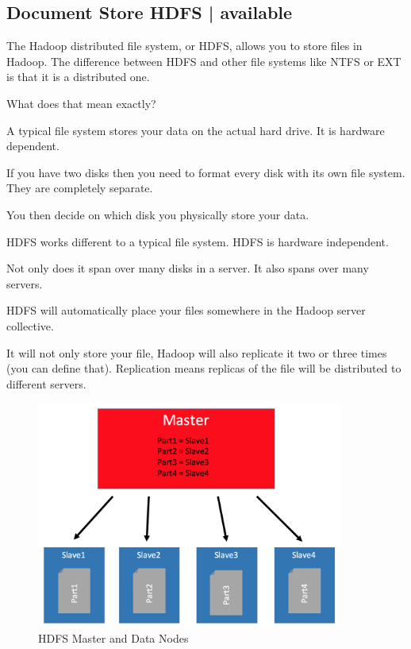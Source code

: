 \documentclass[12pt, numbers=noenddot]{scrreprt} %
\begin{document}
\subsection{Document Store HDFS | available}

The Hadoop distributed file system, or HDFS, allows you to store files in Hadoop. The difference between HDFS and other file systems like NTFS or EXT is that it is a distributed one.

What does that mean exactly?

A typical file system stores your data on the actual hard drive. It is hardware dependent.

If you have two disks then you need to format every disk with its own file system. They are completely separate.

You then decide on which disk you physically store your data.

HDFS works different to a typical file system. HDFS is hardware independent.

Not only does it span over many disks in a server. It also spans over many servers.

HDFS will automatically place your files somewhere in the Hadoop server collective.

It will not only store your file, Hadoop will also replicate it two or three times (you can define that). Replication means replicas of the file will be distributed to different servers.

\begin{figure}[htbp]
  \centering
     \includegraphics[width=0.9\textwidth]{images/HDFS-Master-DataNodes}
  \caption{HDFS Master and Data Nodes}
  \label{fig:Bild1}
\end{figure}
\end{document}
